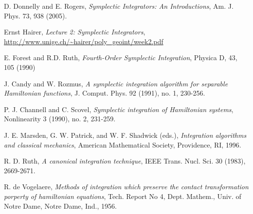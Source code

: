 \documentclass[12pt]{article}
\begin{document}
\newpage
\begin{thebibliography}{1}

   D. Donnelly and E. Rogers, \emph{Symplectic Integrators: An Introductions}, Am. J. Phys. 73, 938 (2005).

   Ernst Hairer, \emph{Lecture 2: Symplectic Integrators}, \url{http://www.unige.ch/~hairer/poly_geoint/week2.pdf}

   E. Forest and R.D. Ruth, \emph{Fourth-Order Symplectic Integration}, Physica D, 43, 105 (1990)

    J. Candy and W. Rozmus, \emph{A symplectic integration algorithm for separable
Hamiltonian functions}, J. Comput. Phys. 92 (1991), no. 1, 230-256.

   P. J. Channell and C. Scovel, \emph{Symplectic integration of Hamiltonian systems}, Nonlinearity 3 (1990), no. 2, 231-259.

   J. E. Marsden, G. W. Patrick, and W. F. Shadwick (eds.), \emph{Integration algorithms and classical mechanics}, American Mathematical Society, Providence, RI, 1996.

   R. D. Ruth, \emph{A canonical integration technique}, IEEE Trans. Nucl. Sci. 30
(1983), 2669-2671.

   R. de Vogelaere, \emph{Methods of integration which preserve the contact transformation porperty of hamiltonian equations}, Tech. Report No 4, Dept. Mathem., Univ. of Notre Dame, Notre Dame, Ind., 1956.

\end{thebibliography}
\end{document}
